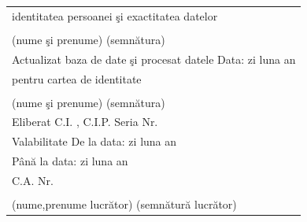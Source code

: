 \documentclass[10pt,a4paper]{article}
\newcommand{\fillline}[1][6cm]{\underline{\hspace{#1}}}
\newcommand{\fillbox}[1][0.4cm]{\framebox[#1]{\rule{0pt}{#1}}}
\begin{document}
\begin{tabularx}{\textwidth}{|m{3cm}|X|}
\multicolumn{2}{|l|}{identitatea persoanei şi exactitatea datelor} \\
\multicolumn{2}{|l|}{\fillline[6cm] \hfill \fillline[5cm]} \\
\multicolumn{2}{|l|}{\footnotesize (nume şi prenume) \hfill (semnătura)} \\
\hline
\multicolumn{2}{|l|}{Actualizat baza de date şi procesat datele \hfill Data: \hspace{0.3cm} zi \fillbox\fillbox \hspace{0.3cm} luna \fillbox\fillbox \hspace{0.3cm} an \fillbox\fillbox\fillbox\fillbox} \\
\multicolumn{2}{|l|}{pentru cartea de identitate} \\
\multicolumn{2}{|l|}{\fillline[6cm] \hfill \fillline[5cm]} \\
\multicolumn{2}{|l|}{\footnotesize (nume şi prenume) \hfill (semnătura)} \\
\hline
\multicolumn{2}{|l|}{Eliberat \hspace{0.3cm} C.I. , C.I.P. \hspace{0.5cm} Seria \fillbox\fillbox \hspace{0.3cm} Nr. \fillbox\fillbox\fillbox\fillbox\fillbox\fillbox} \\
\multicolumn{2}{|l|}{\hspace{1.5cm} Valabilitate \hspace{0.3cm} De la data: \hspace{0.3cm} zi \fillbox\fillbox \hspace{0.3cm} luna \fillbox\fillbox \hspace{0.3cm} an \fillbox\fillbox\fillbox\fillbox} \\
\multicolumn{2}{|l|}{\hspace{1.5cm} \phantom{Valabilitate} \hspace{0.3cm} Până la data: \hspace{0.3cm} zi \fillbox\fillbox \hspace{0.3cm} luna \fillbox\fillbox \hspace{0.3cm} an \fillbox\fillbox\fillbox\fillbox} \\
\multicolumn{2}{|l|}{\hspace{1.5cm} C.A. \hspace{0.5cm} Nr. \fillbox\fillbox\fillbox\fillbox\fillbox\fillbox\fillbox} \\
\multicolumn{2}{|l|}{\fillline[6cm] \hfill \fillline[6cm]} \\
\multicolumn{2}{|l|}{\footnotesize (nume,prenume lucrător) \hfill (semnătură lucrător)} \\

\end{tabularx}
\end{document}
